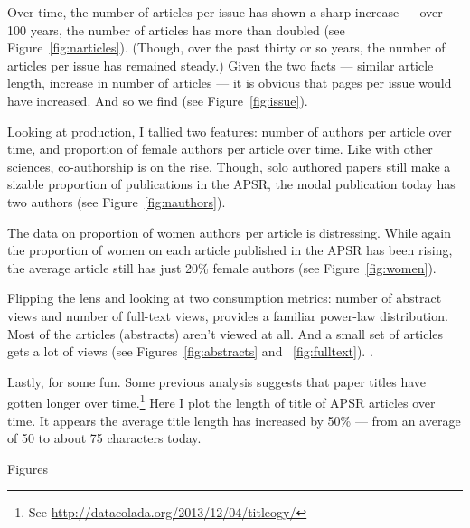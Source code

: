 \documentclass[11pt]{article}
\begin{document}
Over time, the number of articles per issue has shown a sharp increase --- over 100 years, the number of articles has more than doubled (see Figure~\ref{fig:narticles}). (Though, over the past thirty or so years, the number of articles per issue has remained steady.) Given the two facts --- similar article length, increase in number of articles --- it is obvious that pages per issue would have increased. And so we find (see Figure~\ref{fig:issue}). 

Looking at production, I tallied two features: number of authors per article over time, and proportion of female authors per article over time. Like with other sciences, co-authorship is on the rise. Though, solo authored papers still make a sizable proportion of publications in the APSR, the modal publication today has two authors (see Figure~\ref{fig:nauthors}).

The data on proportion of women authors per article is distressing. While again the proportion of women on each article published in the APSR has been rising, the average article still has just 20\% female authors (see Figure~\ref{fig:women}).  

Flipping the lens and looking at two consumption metrics: number of abstract views and number of full-text views, provides a familiar power-law distribution. Most of the articles (abstracts) aren't viewed at all. And a small set of articles gets a lot of views (see Figures~\ref{fig:abstracts} and ~\ref{fig:fulltext}). .

Lastly, for some fun. Some previous analysis suggests that paper titles have gotten longer over time.\footnote{See \href{http://datacolada.org/2013/12/04/titleogy/}{http://datacolada.org/2013/12/04/titleogy/}} Here I plot the length of title of APSR articles over time. It appears the average title length has increased by 50\% --- from an average of 50 to about 75 characters today.

\clearpage
\begin{center}
\large{Figures}
\end{center}
\end{document}
